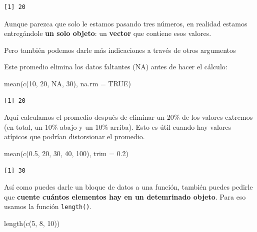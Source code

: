 \documentclass[
  letterpaper,
  DIV=11,
  numbers=noendperiod,
  twoside]{scrreprt}
\newenvironment{Shaded}{\begin{snugshade}}{\end{snugshade}}
\newcommand{\AttributeTok}[1]{\textcolor[rgb]{0.40,0.45,0.13}{#1}}
\newcommand{\ConstantTok}[1]{\textcolor[rgb]{0.56,0.35,0.01}{#1}}
\newcommand{\DecValTok}[1]{\textcolor[rgb]{0.68,0.00,0.00}{#1}}
\newcommand{\FloatTok}[1]{\textcolor[rgb]{0.68,0.00,0.00}{#1}}
\newcommand{\FunctionTok}[1]{\textcolor[rgb]{0.28,0.35,0.67}{#1}}
\newcommand{\NormalTok}[1]{\textcolor[rgb]{0.00,0.23,0.31}{#1}}
\begin{document}
\begin{verbatim}
[1] 20
\end{verbatim}

Aunque parezca que solo le estamos pasando tres números, en realidad
estamos entregándole \textbf{un solo objeto}: un \textbf{vector} que
contiene esos valores.

Pero también podemos darle más indicaciones a través de otros argumentos

Este promedio elimina los datos faltantes (NA) antes de hacer el
cálculo:

\begin{Shaded}
\begin{Highlighting}[]
\FunctionTok{mean}\NormalTok{(}\FunctionTok{c}\NormalTok{(}\DecValTok{10}\NormalTok{, }\DecValTok{20}\NormalTok{, }\ConstantTok{NA}\NormalTok{, }\DecValTok{30}\NormalTok{), }\AttributeTok{na.rm =} \ConstantTok{TRUE}\NormalTok{)}
\end{Highlighting}
\end{Shaded}

\begin{verbatim}
[1] 20
\end{verbatim}

Aquí calculamos el promedio después de eliminar un 20\% de los valores
extremos (en total, un 10\% abajo y un 10\% arriba). Esto es útil cuando
hay valores atípicos que podrían distorsionar el promedio.

\begin{Shaded}
\begin{Highlighting}[]
\FunctionTok{mean}\NormalTok{(}\FunctionTok{c}\NormalTok{(}\FloatTok{0.5}\NormalTok{, }\DecValTok{20}\NormalTok{, }\DecValTok{30}\NormalTok{, }\DecValTok{40}\NormalTok{, }\DecValTok{100}\NormalTok{), }\AttributeTok{trim =} \FloatTok{0.2}\NormalTok{)}
\end{Highlighting}
\end{Shaded}

\begin{verbatim}
[1] 30
\end{verbatim}

Así como puedes darle un bloque de datos a una función, también puedes
pedirle que \textbf{cuente cuántos elementos hay en un detemrinado
objeto}. Para eso usamos la función \texttt{length()}.

\begin{Shaded}
\begin{Highlighting}[]
\FunctionTok{length}\NormalTok{(}\FunctionTok{c}\NormalTok{(}\DecValTok{5}\NormalTok{, }\DecValTok{8}\NormalTok{, }\DecValTok{10}\NormalTok{))}
\end{Highlighting}
\end{Shaded}
\end{document}
